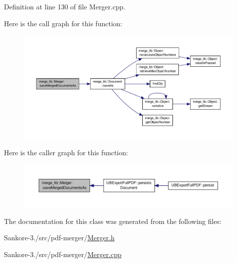 Definition at line 130 of file Merger.\-cpp.



Here is the call graph for this function\-:
\nopagebreak
\begin{figure}[H]
\begin{center}
\leavevmode
\includegraphics[width=350pt]{d8/d35/classmerge__lib_1_1_merger_ac76384e07224912ee9c816bc2d89d6f9_cgraph}
\end{center}
\end{figure}




Here is the caller graph for this function\-:
\nopagebreak
\begin{figure}[H]
\begin{center}
\leavevmode
\includegraphics[width=350pt]{d8/d35/classmerge__lib_1_1_merger_ac76384e07224912ee9c816bc2d89d6f9_icgraph}
\end{center}
\end{figure}




The documentation for this class was generated from the following files\-:\begin{DoxyCompactItemize}
\item 
Sankore-\/3./src/pdf-\/merger/\hyperlink{_merger_8h}{Merger.\-h}\item 
Sankore-\/3./src/pdf-\/merger/\hyperlink{_merger_8cpp}{Merger.\-cpp}\end{DoxyCompactItemize}

